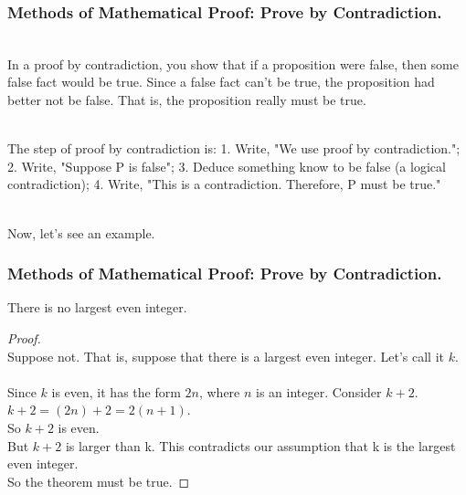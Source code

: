 \documentclass{beamer}
\numberwithin{equation}{section}
\begin{document}
\begin{frame}
\frametitle{Methods of Mathematical Proof: Prove by Contradiction.}

\ \\In a proof by contradiction, you show that if a proposition were false, then some false fact would be true. Since a false fact can't be true, the proposition had better not be false. That is, the proposition really must be true. \pause

\ \\The step of proof by contradiction is: 1. Write, "We use proof by contradiction."; 2. Write, "Suppose P is false"; 3. Deduce something know to be false (a logical contradiction); 4. Write, "This is a contradiction. Therefore, P must be true." \pause

\ \\Now, let's see an example.

\end{frame}



\begin{frame}
\frametitle{Methods of Mathematical Proof: Prove by Contradiction.}

\begin{theorem}
There is no largest even integer.
\end{theorem}

\begin{proof}
\ \\Suppose not. That is, suppose that there is a largest even integer. Let's call it $k$. \pause
\ \\Since $k$ is even, it has the form $2n$, where $n$ is an integer. \pause Consider $k + 2$. $k + 2 = (2n) + 2 = 2 (n + 1)$. \pause
\ \\So $k + 2$ is even. \pause
\ \\But $k + 2$ is larger than k. This contradicts our assumption that k is the largest even integer. \pause
\ \\So the theorem must be true.
\end{proof}

\end{frame}
\end{document}
